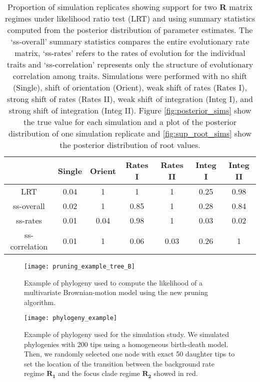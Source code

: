 \begin{table}[h]
\begin{small}
\caption{Proportion of simulation replicates showing support for two $\mathbf{R}$ matrix regimes under likelihood ratio test (LRT) and using summary statistics computed from the posterior distribution of parameter estimates. The `ss-overall' summary statistics compares the entire evolutionary rate matrix, `ss-rates' refers to the rates of evolution for the individual traits and `ss-correlation' represents only the structure of evolutionary correlation among traits. Simulations were performed with no shift (Single), shift of orientation (Orient), weak shift of rates (Rates I), strong shift of rates (Rates II), weak shift of integration (Integ I), and strong shift of integration (Integ II). Figure \ref{fig:posterior_sims} show the true value for each simulation and a plot of the posterior distribution of one simulation replicate and \ref{fig:sup_root_sims} show the posterior distribution of root values.}
\label{tab:model_test}
\end{small}
\begin{center}
\begin{tabular}{ccccccc}
\hline 
 & Single & Orient & Rates I & Rates II & Integ I & Integ II \\ 
\hline 
LRT & 0.04 & 1 & 1 & 1 & 0.25 & 0.98 \\ 
ss-overall & 0.02 & 1 & 0.85 & 1 & 0.28 & 0.84 \\
ss-rates & 0.01 & 0.04 & 0.98 & 1 & 0.03 & 0.02 \\
ss-correlation & 0.01 & 1 & 0.06 & 0.03 & 0.26 & 1 \\
\hline
\end{tabular}
\end{center}
\end{table}

\pagebreak

\begin{figure}[h]
	\centering
	\texttt{[image: pruning\_example\_tree\_B]}
	\caption{Example of phylogeny used to compute the likelihood of a multivariate Brownian-motion model using the new pruning algorithm.}
	\label{fig:example_phylo}
\end{figure}

\pagebreak

\begin{figure}[h]
	\centering
	\texttt{[image: phylogeny\_example]}
	\caption{Example of phylogeny used for the simulation study. We simulated phylogenies with 200 tips using a homogeneous birth-death model. Then, we randomly selected one node with exact 50 daughter tips to set the location of the transition between the background rate regime $\mathbf{R_{1}}$ and the focus clade regime $\mathbf{R_{2}}$ showed in red.}
	\label{fig:phylogeny_sims}
\end{figure}

